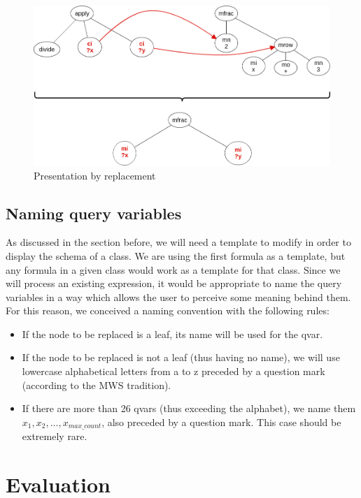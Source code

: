 \documentclass[a4paper,oneside]{article}
\def\MWS{\textsf{MWS}\xspace}
\begin{document}
\begin{figure}[ht]\centering
    \includegraphics[scale=0.5]{img/replacement_pres.png}
    \caption{Presentation by replacement}\label{fig:replacement_pres}
\end{figure}
\FloatBarrier

\subsection{Naming query variables}\label{subsec:naming_qvars}
As discussed in the section before, we will need a template to modify in order
to display the schema of a class. We are using the first formula as a template,
but any formula in a given class would work as a template for that class.
Since we will process an existing expression, it would be appropriate to name
the query variables in a way which allows the user to perceive some meaning
behind them. For this reason, we conceived a naming convention with the
following rules:

\begin{itemize}
    \item If the node to be replaced is a leaf, its name will be used for the
        qvar.
    \item If the node to be replaced is not a leaf (thus having no name), we
        will use lowercase alphabetical letters from \textsf{a} to \textsf{z}
        preceded by a question mark (according to the \MWS tradition).
    \item If there are more than 26 qvars (thus exceeding the alphabet), we
        name them $x_{1}, x_{2}, \ldots, x_{max\_count}$, also preceded by a
        question mark. This case should be extremely rare.
\end{itemize}

\section{Evaluation}\label{sec:evaluation}
\end{document}
